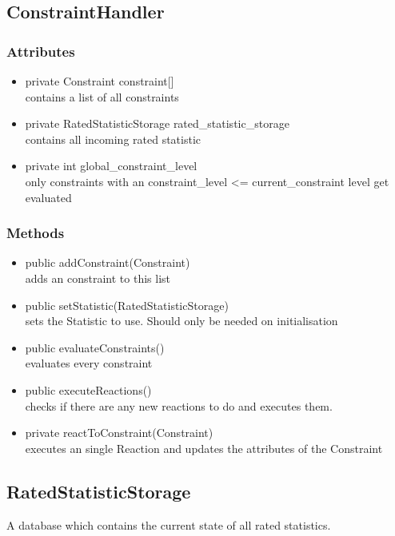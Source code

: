 
\subsection{ConstraintHandler}
\subsubsection{Attributes}
\begin{itemize}
	\item private  Constraint constraint[]\\
	contains a list of all constraints
	\item private  RatedStatisticStorage rated\_statistic\_storage\\
	contains all incoming rated statistic
	\item private  int global\_constraint\_level\\
	only constraints with an constraint\_level <= current\_constraint level get evaluated
\end{itemize}
\subsubsection{Methods}
\begin{itemize}
	\item public addConstraint(Constraint) \\
		adds an constraint to this list
	\item public setStatistic(RatedStatisticStorage) \\
		sets the Statistic to use. Should only be needed on initialisation
	\item public evaluateConstraints() \\
		evaluates every constraint
	\item public executeReactions() \\
		checks if there are any new reactions to do and executes them.
	\item private reactToConstraint(Constraint) \\
		executes an single Reaction and updates the attributes of the Constraint
\end{itemize}


\subsection{RatedStatisticStorage}
A database which contains the current state of all rated statistics.
